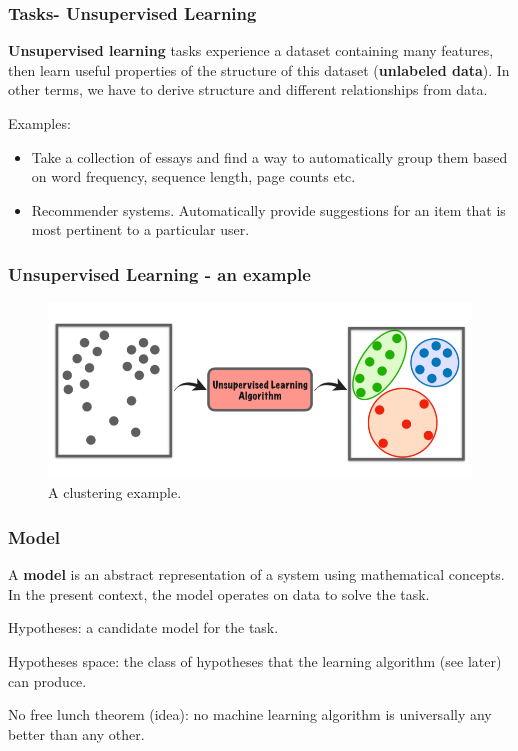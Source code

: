 \documentclass{beamer}
\begin{document}
	\begin{frame}
		\frametitle{Tasks- Unsupervised Learning}
		\textbf{Unsupervised learning} tasks experience a dataset containing many features, then learn useful properties of the structure of this dataset (\textbf{unlabeled data}). In other terms, we have to derive structure and different relationships from data.
		
		Examples:
		\begin{itemize}
			\item Take a collection of essays and find a way to automatically group them based on word frequency, sequence length, page counts etc.
			\item Recommender systems. Automatically provide suggestions for an item
			that is most pertinent to a particular user.
		\end{itemize} 
		
	\end{frame}

	\begin{frame}
		\frametitle{Unsupervised Learning - an example}
		\begin{figure}
			\centering
			\includegraphics[scale=0.35]{images/unsupervised-learning}
			\caption{A clustering example.}
		\end{figure}
	\end{frame}

	\begin{frame}
		\frametitle{Model}
		A \textbf{model} is an abstract representation of a system using mathematical concepts. In the present context, the model operates on data to solve the task.
		
		\vspace{5mm}
		
		Hypotheses: a candidate model for the task.
		
		Hypotheses space: the class of hypotheses that the learning algorithm (see later) can produce.
		
		\vspace{5mm}
		
		No free lunch theorem (idea): no machine learning algorithm is universally any better than any other.
	\end{frame}
\end{document}

